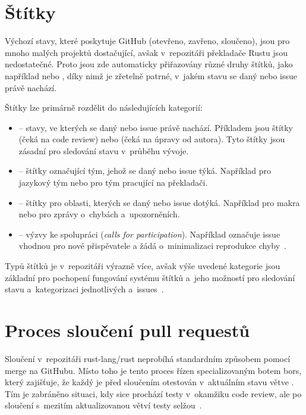 \section{Štítky}
\label{sec:rust_labels}

Výchozí stavy, které poskytuje GitHub (otevřeno, zavřeno, sloučeno), jsou pro mnoho malých projektů dostačující, avšak v~repozitáři překladače Rustu jsou nedostatečné. Proto jsou zde automaticky přiřazovány různé druhy štítků, jako například  nebo , díky nimž je zřetelně patrné, v~jakém stavu se daný \PR nebo issue právě nachází.

Štítky lze primárně rozdělit do následujících kategorií:

\begin{itemize}
  \item {} -- stavy, ve kterých se daný \PR nebo issue právě nachází. Příkladem jsou štítky  (\PR čeká na code review) nebo  (\PR čeká na úpravy od autora). Tyto štítky jsou zásadní pro sledování stavu v~průběhu vývoje.
  \item {} -- štítky označující tým, jehož se daný \PR nebo issue týká. Například  pro jazykový tým nebo  pro tým pracující na překladači.
  \item {} -- štítky pro oblasti, kterých se daný \PR nebo issue dotýká. Například  pro makra nebo  pro zprávy o~chybách a~upozorněních.
  \item {} -- výzvy ke spolupráci (\textit{calls for participation}). Například  označuje issue vhodnou pro nové přispěvatele a  žádá o~minimalizaci reprodukce chyby~\cite{rust_issue_triaging}.
\end{itemize}

Typů štítků je v~repozitáři výrazně více, avšak výše uvedené kategorie jsou základní pro pochopení fungování systému štítků a~jeho možností pro sledování stavu a~kategorizaci jednotlivých \PR a~issues~\cite{rust_issue_triaging}.

\section{Proces sloučení pull requestů}
\label{sec:rust_merge_process}

Sloučení \PR v~repozitáři rust-lang/rust neprobíhá standardním způsobem pomocí merge na GitHubu. Místo toho je tento proces řízen specializovaným botem bors, který zajišťuje, že každý \PR je před sloučením otestován v~aktuálním stavu větve . Tím je zabráněno situaci, kdy \PR sice prochází testy v~okamžiku code review, ale po sloučení s~mezitím aktualizovanou větví  testy selžou~\cite{rust_lang_bors}.

